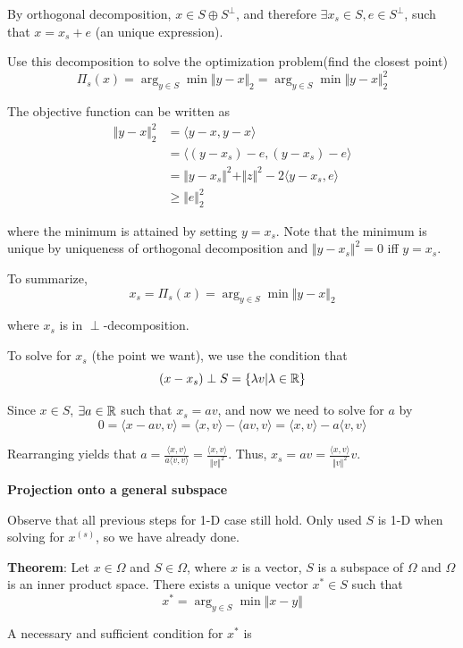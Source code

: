 By orthogonal decomposition,  $x\in S\oplus S^{\perp}$, and therefore $\exists x_{s}\in S, e\in S^{\perp}$, such that $x=x_{s}+e$ (an unique expression).

Use this decomposition to solve the optimization problem(find the closest point)
$$\Pi_{s}(x)=\arg_{y\in S} \min \Vert y-x\Vert_{2}=\arg_{y\in S} \min \Vert y-x\Vert_{2}^{2}$$

The objective function can be written as
\begin{align*}
\Vert y-x\Vert_{2}^{2}&=\langle y-x,y-x\rangle\\
&=\langle (y-x_{s})-e,(y-x_{s})-e\rangle\\
&=\Vert y-x_{s}\Vert^{2} + \Vert z\Vert^{2} - 2\langle y-x_{s},e\rangle\\
&\geq \Vert e\Vert_{2}^{2}
\end{align*}

where the minimum is attained by setting $y=x_{s}$. Note that the minimum is unique by uniqueness of orthogonal decomposition and $\Vert y-x_{s}\Vert^{2}=0$ iff $y=x_{s}$.

To summarize, 
$$x_{s}=\Pi_{s}(x)=\arg_{y\in S} \min \Vert y-x\Vert_{2}$$

where $x_{s}$ is in $\perp$-decomposition.

To solve for $x_{s}$ (the point we want), we use the condition that
$$(x-x_{s}) \perp S=\{\lambda v|\lambda\in\mathbb{R}\}$$

Since $x\in S$, $\exists a\in\mathbb{R}$ such that $x_{s}=av$, and now we need to solve for $a$ by
$$0=\langle x-av,v\rangle=\langle x,v\rangle-\langle av,v\rangle=\langle x,v\rangle-a\langle v,v\rangle$$

Rearranging yields that $a=\frac{\langle x,v\rangle}{a\langle v,v\rangle}=\frac{\langle x,v\rangle}{\Vert v\Vert^{2}}$. Thus, $x_{s}=av=\frac{\langle x,v\rangle}{\Vert v\Vert^{2}}v$.


\vspace{0.5cm}
\textbf{Projection onto a general subspace}

Observe that all previous steps for 1-D case still hold. Only used $S$ is 1-D when solving for $x^{(s)}$, so we have already done.

\textbf{Theorem}: Let $x\in\Omega$ and $S\in\Omega$, where $x$ is a vector, $S$ is a subspace of $\Omega$ and $\Omega$ is an inner product space. There exists a unique vector $x^{*}\in S$ such that
$$x^{*} = \arg_{y\in S}\min \Vert x-y\Vert$$

A necessary and sufficient condition for $x^{*}$ is

